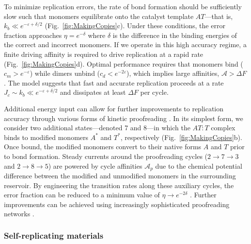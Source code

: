 \begin{appendices}
To minimize replication errors, the rate of bond formation should be sufficiently slow such that monomers equilibrate onto the catalyst template $AT$---that is, $k_b\ll e^{-\varepsilon + \delta/2}$ (Fig.~\ref{fig:MakingCopies}c). Under these conditions, the error fraction approaches $\eta = e^{-\delta}$ where $\delta$ is the difference in the binding energies of the correct and incorrect monomers.  If we operate in this high accuracy regime, a finite driving affinity is required to drive replication at a rapid rate (Fig.~\ref{fig:MakingCopies}d).  Optimal performance requires that monomers bind ($c_m>e^{-\varepsilon}$) while dimers unbind ($c_d<e^{-2\varepsilon}$), which implies large affinities, $\mathcal{A}>\Delta F$.  The model suggests that fast and accurate replication proceeds at a rate $J_c\sim k_b\ll e^{-\varepsilon+\delta/2}$ and dissipates at least $\Delta F$ per cycle. 

Additional energy input can allow for further improvements to replication accuracy through various forms of kinetic proofreading \autocite{Hopfield1974, Murugan2012}.  In its simplest form, we consider two additional states---denoted 7 and 8---in which the $AT:T$ complex binds to modified monomers $A^*$ and $T^*$, respectively (Fig.~\ref{fig:MakingCopies}b). Once bound, the modified monomers convert to their native forms $A$ and $T$ prior to bond formation.  Steady currents around the proofreading cycles ($2\rightarrow7\rightarrow3$ and $2\rightarrow8\rightarrow5$) are powered by cycle affinities $\mathcal{A}_p$ due to the chemical potential difference between the modified and unmodified monomers in the surrounding reservoir.  By engineering the transition rates along these auxiliary cycles, the error fraction can be reduced to a minimum value of $\eta\rightarrow e^{-2\delta}$ \autocite{Hartich2015}. Further improvements can be achieved using increasingly sophisticated proofreading networks \autocite{Murugan2012}.

\subsubsection{Self-replicating materials}


\end{appendices}
